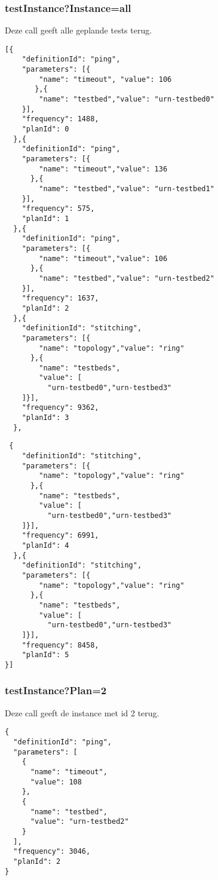 \documentclass[11pt]{article}
\begin{document}
\subsubsection{testInstance?Instance=all}
Deze call geeft alle geplande tests terug.
\begin{verbatim}
[{
    "definitionId": "ping",
    "parameters": [{
        "name": "timeout", "value": 106
       },{
        "name": "testbed","value": "urn-testbed0"
    }],
    "frequency": 1488,
    "planId": 0
  },{
    "definitionId": "ping",
    "parameters": [{
        "name": "timeout","value": 136
      },{
        "name": "testbed","value": "urn-testbed1"
    }],
    "frequency": 575,
    "planId": 1
  },{
    "definitionId": "ping",
    "parameters": [{
        "name": "timeout","value": 106
      },{
        "name": "testbed","value": "urn-testbed2"
    }],
    "frequency": 1637,
    "planId": 2
  },{
    "definitionId": "stitching",
    "parameters": [{
        "name": "topology","value": "ring"
      },{
        "name": "testbeds",
        "value": [
          "urn-testbed0","urn-testbed3"
    ]}],
    "frequency": 9362,
    "planId": 3
  },
 \end{verbatim}
 \clearpage
 \begin{verbatim}
 {
    "definitionId": "stitching",
    "parameters": [{
        "name": "topology","value": "ring"
      },{
        "name": "testbeds",
        "value": [
          "urn-testbed0","urn-testbed3"
    ]}],
    "frequency": 6991,
    "planId": 4
  },{
    "definitionId": "stitching",
    "parameters": [{
        "name": "topology","value": "ring"
      },{
        "name": "testbeds",
        "value": [
          "urn-testbed0","urn-testbed3"
    ]}],
    "frequency": 8458,
    "planId": 5
}]
\end{verbatim}

\subsubsection{testInstance?Plan=2}
Deze call geeft de instance met id 2 terug.
\begin{verbatim}
{
  "definitionId": "ping",
  "parameters": [
    {
      "name": "timeout",
      "value": 108
    },
    {
      "name": "testbed",
      "value": "urn-testbed2"
    }
  ],
  "frequency": 3046,
  "planId": 2
}
\end{verbatim}

\clearpage
\end{document}
